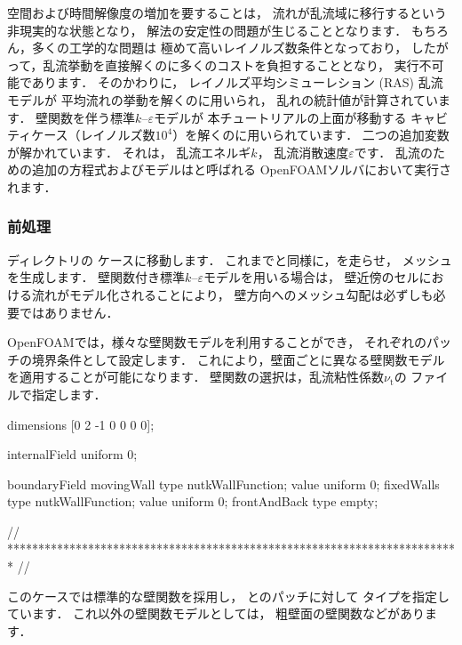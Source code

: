 空間および時間解像度の増加を要することは，
流れが乱流域に移行するという非現実的な状態となり，
解法の安定性の問題が生じることとなります．
もちろん，多くの工学的な問題は
極めて高いレイノルズ数条件となっており，
したがって，乱流挙動を直接解くのに多くのコストを負担することとなり，
実行不可能であります．
そのかわりに，
%
レイノルズ平均シミューレション (RAS) 乱流モデルが
平均流れの挙動を解くのに用いられ，
乱れの統計値が計算されています．
壁関数を伴う標準$k$--$\varepsilon$モデルが
本チュートリアルの上面が移動する
キャビティケース（レイノルズ数$10^{4}$）を解くのに用いられています．
二つの追加変数が解かれています．
それは，
%
乱流エネルギ$k$，
%
乱流消散速度$\varepsilon$です．
乱流のための追加の方程式およびモデルはと呼ばれる
OpenFOAMソルバにおいて実行されます．

\subsubsection{前処理}
\label{sssec:2.1.8.1}
ディレクトリの
ケースに移動します．
これまでと同様に，を走らせ，
メッシュを生成します．
壁関数付き標準$k$--$\varepsilon$モデルを用いる場合は，
壁近傍のセルにおける流れがモデル化されることにより，
壁方向へのメッシュ勾配は必ずしも必要ではありません．

OpenFOAMでは，様々な壁関数モデルを利用することができ，
それぞれのパッチの境界条件として設定します．
これにより，壁面ごとに異なる壁関数モデルを適用することが可能になります．
壁関数の選択は，乱流粘性係数$\nu_{\mathrm{t}}$の
ファイルで指定します．
\begin{OFverbatim}[file, linenum=17]

dimensions      [0 2 -1 0 0 0 0];

internalField   uniform 0;

boundaryField
{
    movingWall
    {
        type            nutkWallFunction;
        value           uniform 0;
    }
    fixedWalls
    {
        type            nutkWallFunction;
        value           uniform 0;
    }
    frontAndBack
    {
        type            empty;
    }
}


// ************************************************************************* //
\end{OFverbatim}
このケースでは標準的な壁関数を採用し，
とのパッチに対して
タイプを指定しています．
これ以外の壁関数モデルとしては，
粗壁面の壁関数などがあります．

